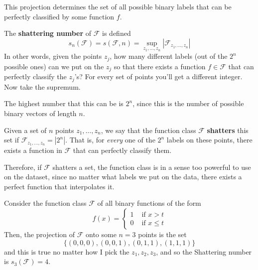   This projection determines the set of all possible binary labels that can be perfectly classified by some function $f$. 

  \begin{definition}
    The \textbf{shattering number} of $\mathcal{F}$ is defined 
    \begin{equation}
      s_n (\mathcal{F}) = s(\mathcal{F}, n) = \sup_{z_1, \ldots, z_n} |\mathcal{F}_{z_1, \ldots, z_n}|
    \end{equation}
    In other words, given the points $z_j$, how many different labels (out of the $2^n$ possible ones) can we put on the $z_j$ so that there exists a function $f \in \mathcal{F}$ that can perfectly classify the $z_j$'s? For every set of points you'll get a different integer. Now take the supremum. 
  \end{definition}

  The highest number that this can be is $2^n$, since this is the number of possible binary vectors of length $n$. 

  \begin{definition}
    Given a set of $n$ points $z_1, \ldots, z_n$, we say that the function class $\mathcal{F}$ \textbf{shatters} this set if $\mathcal{F}_{z_1, \ldots, z_n} = |2^n|$. That is, for \textit{every} one of the $2^n$ labels on these points, there exists a function in $\mathcal{F}$ that can perfectly classify them. 
  \end{definition}

  Therefore, if $\mathcal{F}$ shatters a set, the function class is in a sense too powerful to use on the dataset, since no matter what labels we put on the data, there exists a perfect function that interpolates it. 

  \begin{example}
    Consider the function class $\mathcal{F}$ of all binary functions of the form 
    \begin{equation}
      f(x) = \begin{cases} 1 & \text{ if } x > t \\
        0 & \text{ if } x \leq t \end{cases} 
    \end{equation}
    Then, the projection of $\mathcal{F}$ onto some $n = 3$ points is the set 
    \begin{equation}
      \{ (0, 0, 0), (0, 0, 1), (0, 1, 1), (1, 1, 1) \}
    \end{equation}
    and this is true no matter how I pick the $z_1, z_2, z_3$, and so the Shattering number is $s_3 (\mathcal{F}) = 4$. 
  \end{example}

